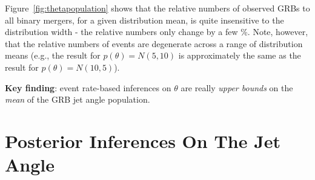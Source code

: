 \documentclass[a0,landscape]{a0poster}
\begin{document}
\begin{multicols}{4}

Figure~\ref{fig:thetapopulation} shows that the relative numbers of observed GRBs
to all binary mergers, for a given distribution mean, is quite insensitive to
the distribution width - the relative numbers only change by a few \%.
%
Note, however, that the relative numbers of events are degenerate across a range
of distribution means (e.g., the result for $p(\theta) = N(5,10)$ is
approximately the same as the result for $p(\theta) = N(10,5)$).  

{\bf Key finding}: event rate-based inferences on $\theta$ are really \emph{upper
bounds} on the \emph{mean} of the GRB jet angle population.



\section*{\centering Posterior Inferences On The Jet Angle}


\end{multicols}
\end{document}
